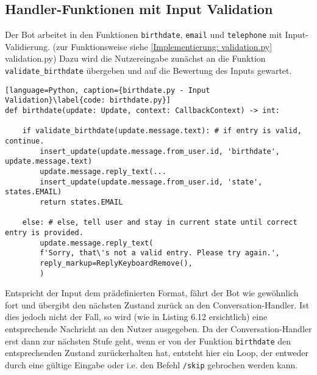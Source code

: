         \subsection{Handler-Funktionen mit Input Validation} \label{Implementierung: handler validation}
            Der Bot arbeitet in den Funktionen \verb|birthdate|, \verb|email| und \verb|telephone| mit Input-Validierung. (zur Funktionsweise siehe \ref{Implementierung: validation.py} validation.py) Dazu wird die Nutzereingabe zunächst an die Funktion \verb|validate_birthdate| übergeben und auf die Bewertung des Inputs gewartet. 
            \begin{lstlisting}[language=Python, caption={birthdate.py - Input Validation}\label{code: birthdate.py}]
def birthdate(update: Update, context: CallbackContext) -> int:

    if validate_birthdate(update.message.text): # if entry is valid, continue.
        insert_update(update.message.from_user.id, 'birthdate', update.message.text)
        update.message.reply_text(...
        insert_update(update.message.from_user.id, 'state', states.EMAIL)
        return states.EMAIL

    else: # else, tell user and stay in current state until correct entry is provided.
        update.message.reply_text(
        f'Sorry, that\'s not a valid entry. Please try again.',
        reply_markup=ReplyKeyboardRemove(),
        )
            \end{lstlisting}
                
            Entspricht der Input dem prädefinierten Format, fährt der Bot wie gewöhnlich fort und übergibt den nächsten Zustand zurück an den Conversation-Handler. Ist dies jedoch nicht der Fall, so wird (wie in Listing 6.12 ersichtlich) eine entsprechende Nachricht an den Nutzer ausgegeben. Da der Conversation-Handler erst dann zur nächsten Stufe geht, wenn er von der Funktion \verb|birthdate| den entsprechenden Zustand zurückerhalten hat, entsteht hier ein Loop, der entweder durch eine gültige Eingabe oder i.e. den Befehl \verb|/skip| gebrochen werden kann.
        
            

